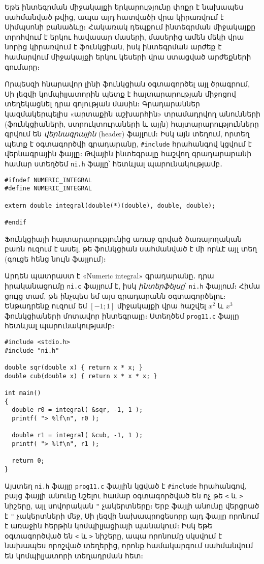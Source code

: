 Եթե ինտեգրման միջակայքի երկարությունը փոքր է նախապես սահմանված
 թվից, ապա այդ հատվածի վրա կիրառվում է Սիմպսոնի
բանաձևը։ Հակառակ դեպքում ինտեգրման միջակայքը տրոհվում է երկու
հավասար մասերի, մասերից ամեն մեկի վրա նորից կիրառվում է
 ֆունկցիան, իսկ ինտեգրման արժեք է համարվում
միջակայքի երկու կեսերի վրա ստացված արժեքների գումարը։

Որպեսզի հնարավոր լինի  ֆունկցիան օգտագործել
այլ ծրագրում, Սի լեզվի կոմպիլյատորին պետք է հայտարարության
միջոցով տեղեկացնել դրա գոյության մասին։ Գրադարաններ
կազմակերպելիս «արտաքին աշխարհին» տրամադրվող անունների
(ֆունկցիաների, ստրուկտուրաների և այլն) հայտարարությունները
գրվում են \emph{վերնագրային} (header) ֆայլում։ Իսկ այն տեղում,
որտեղ պետք է օգտագործվի գրադարանը, \Verb|#include| հրահանգով
կցվում է վերնագրային ֆայլը։ Թվային ինտեգրալը հաշվող գրադարարանի
համար ստեղծեմ \texttt{ni.h} ֆայլը՝ հետևյալ պարունակությամբ․

\begin{Verbatim}
#ifndef NUMERIC_INTEGRAL
#define NUMERIC_INTEGRAL

extern double integral(double(*)(double), double, double);

#endif
\end{Verbatim}

Ֆունկցիայի հայտարարությունից առաջ գրված 
ծառայողական բառն ուզում է ասել, թե  ֆունկցիան
սահմանված է մի որևէ այլ տեղ (գուցե հենց նույն ֆայլում)։

Արդեն պատրաստ է «Numeric integral» գրադարանը․ դրա իրականացումը
\texttt{ni.c} ֆայլում է, իսկ \emph{ինտերֆեյսը}՝ \texttt{ni.h}
ֆայլում։ Հիմա ցույց տամ, թե ինչպես եմ այս գրադարանն օգտագործելու։
Ենթադրենք ուզում եմ \([-1;1]\) միջակայքի վրա հաշվել \(x^2\) և
\(x^3\) ֆունկցիաների մոտավոր ինտեգրալը։ Ստեղծեմ \texttt{prog11.c}
ֆայլը հետևյալ պարունակությամբ։

\begin{Verbatim}
#include <stdio.h>
#include "ni.h"

double sqr(double x) { return x * x; }
double cub(double x) { return x * x * x; }

int main()
{
  double r0 = integral( &sqr, -1, 1 );
  printf( "> %lf\n", r0 );

  double r1 = integral( &cub, -1, 1 );
  printf( "> %lf\n", r1 );

  return 0;
}
\end{Verbatim}

Այստեղ \texttt{ni.h} ֆայլը \texttt{prog11.c} ֆայլին կցված է
\Verb|#include| հրահանգով, բայց ֆայլի անունը նշելու համար
օգտագործված են ոչ թե \Verb|<| և \Verb|>| նիշերը, այլ սովորական
\Verb|"| չակերտները։ Երբ ֆայլի անունը վերցրած է \Verb|"|
չակերտների մեջ, Սի լեզվի նախապրոցեսորը այդ ֆայլը որոնում է
առաջին հերթին կոմպիլյացիայի պանակում։ Իսկ եթե օգտագործված են
\Verb|<| և \Verb|>| նիշերը, ապա որոնումը սկսվում է նախապես
որոշված տեղերից, որոնք համակարգում սահմանվում են կոմպիլյատորի
տեղադրման հետ։

